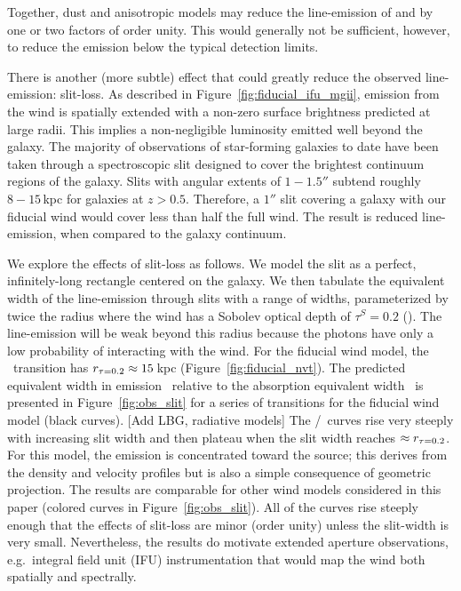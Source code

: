 \documentclass[12pt,preprint]{aastex}
\begin{document}
Together, dust and anisotropic models may reduce the line-emission
of  and 
by one or two factors of order unity.  This would generally
not be sufficient, however, to reduce the emission below the typical detection
limits. 

There is another (more subtle) effect that could
greatly reduce the observed line-emission: slit-loss.  As
described in Figure~\ref{fig:fiducial_ifu_mgii}, 
emission from the wind is spatially extended with
a non-zero surface brightness predicted at large radii. This implies 
a non-negligible luminosity emitted well beyond the galaxy.  
The majority of observations of star-forming galaxies to date have
been taken through a spectroscopic slit designed to cover
the brightest continuum regions of the galaxy. Slits with angular
extents of $1-1.5''$ subtend roughly $8-15$\,kpc for galaxies at $z>0.5$.
Therefore, a $1''$ slit covering a galaxy with our fiducial wind would cover
less than half the full wind.  The result is reduced line-emission,
when compared to the galaxy continuum.

We explore the effects of slit-loss as follows.
We model the slit as a perfect, infinitely-long rectangle centered on the
galaxy.  We then tabulate the equivalent width of the line-emission
through slits with a range of widths, parameterized by twice the radius
where the wind has a Sobolev optical depth of $\tau^S = 0.2$ (\rtt).
The line-emission will be weak beyond
this radius because the photons have only a low probability of
interacting with the wind.  For the fiducial wind model, 
the \mgiia\ transition has $r_{\tau = 0.2} \approx 15$\,kpc 
(Figure~\ref{fig:fiducial_nvt}).  
The predicted equivalent width in emission \ewe\ relative to the absorption
equivalent width \ewabs\ is presented in
Figure~\ref{fig:obs_slit} for a series of transitions for the fiducial
wind model (black curves).
[Add LBG, radiative models]
The \ewe/\ewabs\ curves rise very steeply with increasing slit width and then
plateau when the slit width reaches $\approx r_{\tau = 0.2}$.  
For this model, the emission is concentrated toward the source; this
derives from the density and velocity profiles but is also a simple
consequence of geometric projection.
The results are comparable for other wind models considered
in this paper (colored curves in Figure~\ref{fig:obs_slit}).
All of the curves rise steeply enough that 
the effects of slit-loss are minor (order unity)
unless the slit-width is very small.   
Nevertheless, the results do motivate
extended aperture observations, e.g.\ integral field unit (IFU)
instrumentation that would map the wind both spatially and spectrally.
\end{document}
